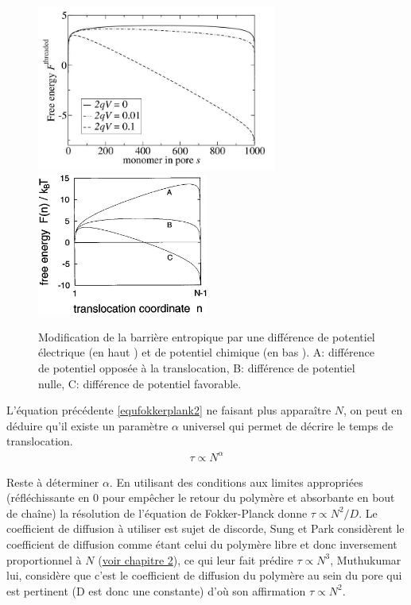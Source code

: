 \begin{figure}[H]
\begin{center}
\includegraphics[width=0.7\textwidth]{transelec.jpg} \includegraphics[width=0.5\textwidth]{transpotchim.jpg}

\caption[Translocation, barrière d'énergie d'origine entropique]{Modification de la barrière entropique par une différence de potentiel électrique (en haut \cite{these}) et de potentiel chimique (en bas \cite{Sung1996}). A: différence de potentiel opposée à la translocation, B: différence de potentiel nulle, C: différence de potentiel favorable.}
\label{energiebarrier}
\end{center}
\end{figure}

L'équation précédente \ref{equfokkerplank2} ne faisant plus apparaître $N$, on peut en déduire qu'il existe un paramètre $\alpha$ universel qui permet de décrire le temps de translocation.
\begin{eqnarray}
\tau \propto N^\alpha
\label{tauunbiased}
\end{eqnarray}


 Reste à déterminer $\alpha$. En utilisant des conditions aux limites appropriées (réfléchissante en 0 pour empêcher le retour du polymère et absorbante en bout de chaîne) la résolution de l'équation de Fokker-Planck donne $\tau \propto N^{2}/D$. Le coefficient de diffusion à utiliser est sujet de discorde, Sung et Park \cite{Sung1996} considèrent le coefficient de diffusion comme étant celui du polymère libre et donc inversement proportionnel à $N$ (\hyperref[fluctudissip]{voir chapitre 2}), ce qui leur fait prédire $\tau \propto N^{3}$, Muthukumar \cite{Muthukumar1999} lui, considère que c'est le coefficient de diffusion du polymère au sein du pore qui est pertinent (D est donc une constante) d'où son affirmation $\tau \propto N^{2}$.
 
